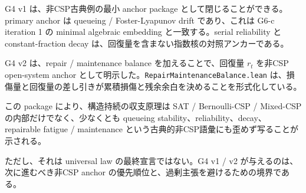\documentclass[12pt,a4paper]{article}
\begin{document}
G4 v1 は、非CSP古典例の最小 anchor package として閉じることができる。primary anchor は queueing / Foster-Lyapunov drift であり、これは G6-c iteration 1 の minimal algebraic embedding と一致する。serial reliability と constant-fraction decay は、回復量を含まない指数核の対照アンカーである。

G4 v2 は、repair / maintenance balance を加えることで、回復量 \(r_{t}\) を非CSP open-system anchor として明示した。\texttt{RepairMaintenanceBalance.lean} は、損傷量と回復量の差し引きが累積損傷と残余余白を決めることを形式化している。

この package により、構造持続の収支原理は SAT / Bernoulli-CSP / Mixed-CSP の内部だけでなく、少なくとも queueing stability、reliability、decay、repairable fatigue / maintenance という古典的非CSP語彙にも歪めず写ることが示される。

ただし、それは universal law の最終宣言ではない。G4 v1 / v2 が与えるのは、次に進むべき非CSP anchor の優先順位と、過剰主張を避けるための境界である。
\end{document}
